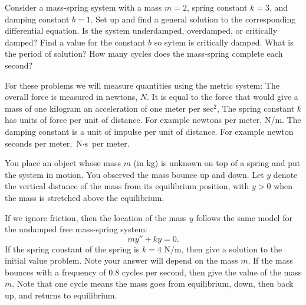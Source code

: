 \pagestyle{fancy}
\renewcommand{\theUnit}{2.4}
\ifthenelse{\isundefined{\UnitPageNumbers}}{}{\setcounter{page}{1}}
\rhead{Section \theUnit: Mechanical Vibrations}
\rfoot{\mypage}
\lfoot{}
\cfoot{}
\renewcommand{\footrulewidth}{.4pt}
\vspace*{-20pt} \thispagestyle{firstfooter}

\bb
\ii Consider a mass-spring system with a mass $m=2$, spring constant $k=3$, and damping constant $b=1$.
\bb
\ii Set up and find a general solution to the corresponding differential equation.
\ii Is the system underdamped, overdamped, or critically damped?
\ii Find a value for the constant $b$ so sytem is critically damped.
\ii What is the period of solution? How many cycles does the mass-spring complete each second?
\ee

\vfill

\bbox
For these problems we will measure quantities using the metric system:
\bi
\ii The overall force is measured in newtons, $N$.
\bi
\ii It is equal to the force that would give a mass of one kilogram an acceleration of one meter per $\mbox{sec}^2$,
\ei
\ii The spring constant $k$ has units of force per unit of distance. For example newtons per meter, N/m.
\ii The damping constant is a unit of impulse per unit of distance. For example newton seconds per meter, $\mbox{N} \cdot \mbox{s}$ per meter.
\ei
\ebox

\newpage

\ii You place an object whose mass $m$ (in kg) is unknown on top of a spring and put the system in motion. You observed the mass bounce up and down. Let $y$ denote the vertical distance of the mass from its equilibrium position, with $y>0$ when the mass is stretched above the equilibrium.

\bb
\ii If we ignore friction, then the location of the mass $y$ follows the same model for the undamped free mass-spring system:
\[ my''+ky=0.\]
If the spring constant of the spring is $k=4 \mbox{ N/m}$, then give a solution to the initial value problem. Note your answer will depend on the mass $m$.
\ii  If the mass bounces with a frequency of $0.8$ cycles per second, then give the value of the mass $m$.
Note that one cycle means the mass goes from equilibrium, down, then back up, and returns to equilibrium. 
\ee


